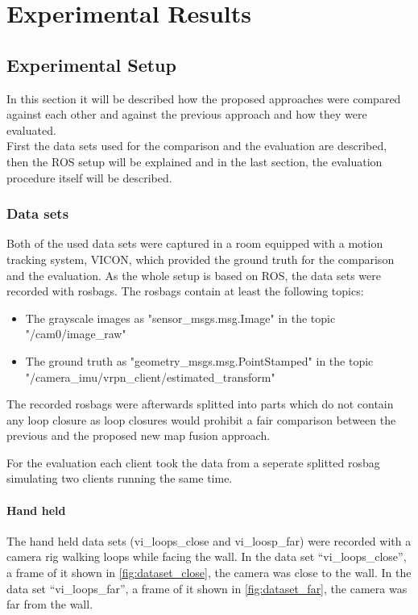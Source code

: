 \chapter{Experimental Results}

\section{Experimental Setup}
In this section it will be described how the proposed approaches were compared against each other and against the previous approach and how they were evaluated.\\
First the data sets used for the comparison and the evaluation are described, then the \acf{ROS} setup will be explained and in the last section, the evaluation procedure itself will be described.

\subsection{Data sets}
Both of the used data sets were captured in a room equipped with a motion tracking system, VICON, which provided the ground truth for the comparison and the evaluation. As the whole setup is based on \ac{ROS}, the data sets were recorded with rosbags. The rosbags contain at least the following topics:
\begin{itemize}
  \item The grayscale images as "sensor\_msgs.msg.Image" in the topic "/cam0/image\_raw"
  \item The ground truth as "geometry\_msgs.msg.PointStamped" in the topic "/camera\_imu/vrpn\_client/estimated\_transform"
\end{itemize}

The recorded rosbags were afterwards splitted into parts which do not contain any loop closure as loop closures would prohibit a fair comparison between the previous and the proposed new map fusion approach.

For the evaluation each client took the data from a seperate splitted rosbag simulating two clients running the same time.

\subsubsection{Hand held}
The hand held data sets (vi\_loops\_close and vi\_loosp\_far) were recorded with a camera rig walking loops while facing the wall. In the data set ``vi\_loops\_close'', a frame of it shown in \autoref{fig:dataset_close}, the camera was close to the wall. In the data set ``vi\_loops\_far'', a frame of it shown in \autoref{fig:dataset_far}, the camera was far from the wall.

